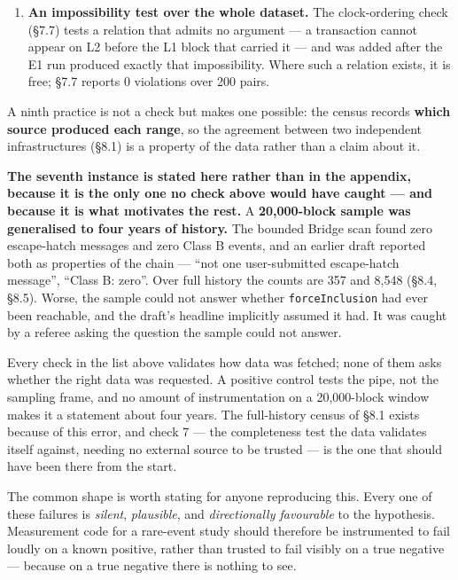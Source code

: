 \documentclass[conference]{IEEEtran}
\renewcommand{\_}{\textunderscore\allowbreak}
\begin{document}
\begin{enumerate}
  numbers are dense, so contiguity can be checked without reference to
  any external source --- which is what makes it a stronger test than a
  positive control. The read-delay census of §8.1 rests on exactly this:
  0 missing indices of 2,563,796.
\item
  \textbf{An impossibility test over the whole dataset.} The
  clock-ordering check (§7.7) tests a relation that admits no argument
  --- a transaction cannot appear on L2 before the L1 block that carried
  it --- and was added after the E1 run produced exactly that
  impossibility. Where such a relation exists, it is free; §7.7 reports
  0 violations over 200 pairs.
\end{enumerate}

A ninth practice is not a check but makes one possible: the census
records \textbf{which source produced each range}, so the agreement
between two independent infrastructures (§8.1) is a property of the data
rather than a claim about it.

\textbf{The seventh instance is stated here rather than in the appendix,
because it is the only one no check above would have caught --- and
because it is what motivates the rest.} A \textbf{20,000-block sample
was generalised to four years of history.} The bounded Bridge scan found
zero escape-hatch messages and zero Class B events, and an earlier draft
reported both as properties of the chain --- ``not one user-submitted
escape-hatch message'', ``Class B: zero''. Over full history the counts
are 357 and 8,548 (§8.4, §8.5). Worse, the sample could not answer
whether \texttt{forceInclusion} had ever been reachable, and the draft's
headline implicitly assumed it had. It was caught by a referee asking
the question the sample could not answer.

Every check in the list above validates how data was fetched; none of
them asks whether the right data was requested. A positive control tests
the pipe, not the sampling frame, and no amount of instrumentation on a
20,000-block window makes it a statement about four years. The
full-history census of §8.1 exists because of this error, and check 7
--- the completeness test the data validates itself against, needing no
external source to be trusted --- is the one that should have been there
from the start.

The common shape is worth stating for anyone reproducing this. Every one
of these failures is \emph{silent}, \emph{plausible}, and
\emph{directionally favourable} to the hypothesis. Measurement code for
a rare-event study should therefore be instrumented to fail loudly on a
known positive, rather than trusted to fail visibly on a true negative
--- because on a true negative there is nothing to see.
\end{document}
